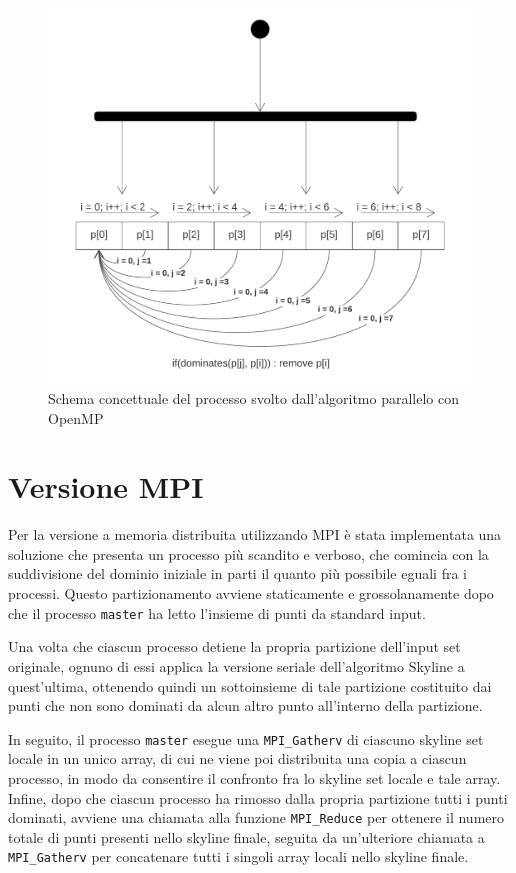 \documentclass[letterpaper,11pt,leqno]{article}
\begin{document}
\begin{figure}[h]
  \centering
    \includegraphics[scale=0.4]{OMP.pdf}
    \caption{Schema concettuale del processo svolto dall'algoritmo parallelo con OpenMP}
    \label{f:graph1}
\end{figure}







\section{Versione MPI}\label{s:section}


Per la versione a memoria distribuita utilizzando MPI è stata implementata una soluzione che presenta un processo più scandito e verboso, che comincia con la suddivisione del dominio iniziale in parti il quanto più possibile eguali fra i processi. Questo partizionamento avviene staticamente e grossolanamente dopo che il processo \texttt{master} ha letto l'insieme di punti da standard input.

Una volta che ciascun processo detiene la propria partizione dell'input set originale, ognuno di essi applica la versione seriale dell'algoritmo Skyline a quest'ultima, ottenendo quindi un sottoinsieme di tale partizione costituito dai punti che non sono dominati da alcun altro punto all'interno della partizione.

In seguito, il processo \texttt{master} esegue una \texttt{MPI\_Gatherv} di ciascuno skyline set locale in un unico array, di cui ne viene poi distribuita una copia a ciascun processo, in modo da consentire il confronto fra lo skyline set locale e tale array. Infine, dopo che ciascun processo ha rimosso dalla propria partizione tutti i punti dominati, avviene una chiamata alla funzione \texttt{MPI\_Reduce} per ottenere il numero totale di punti presenti nello skyline finale, seguita da un'ulteriore chiamata a \texttt{MPI\_Gatherv} per concatenare tutti i singoli array locali nello skyline finale.
\end{document}
